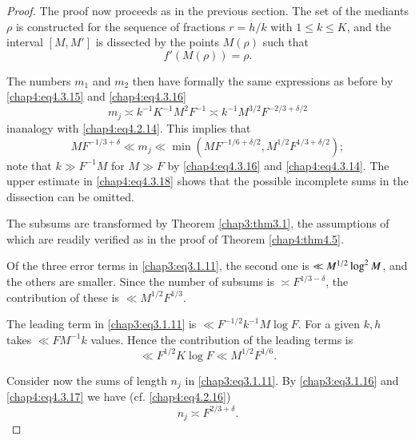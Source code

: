 \begin{proof}
The proof now proceeds as in the previous section. The set of the mediants $\rho$ is constructed for the sequence of fractions $r=h/k$ with $1\leq k\leq K$, and the interval $[M,M']$ is dissected by the points $M(\rho)$ such that 
\begin{equation}\label{chap4:eq4.3.16}
f'(M(\rho))=\rho.
\end{equation}

The numbers $m_1$ and $m_2$ then have formally the same expressions as before by \eqref{chap4:eq4.3.15} and \eqref{chap4:eq4.3.16} 
\begin{equation}\label{chap4:eq4.3.17}
m_j\asymp k^{-1}K^{-1}M^2F^{-1}\asymp k^{-1}M^{3/2}F^{-2/3+\delta/2}
\end{equation}
in\pageoriginale analogy with \eqref{chap4:eq4.2.14}. This implies that
\begin{equation}\label{chap4:eq4.3.18}
MF^{-1/3+\delta}\ll m_j\ll\min\left(MF^{-1/6+\delta/2}, M^{1/2}F^{1/3+\delta/2}\right); 
\end{equation}
note that $k\gg F^{-1}M$ for $M\gg F$ by \eqref{chap4:eq4.3.16} and \eqref{chap4:eq4.3.14}. The upper estimate in \eqref{chap4:eq4.3.18} shows that the possible incomplete sums in the dissection can be omitted.

The subsums are transformed by Theorem \ref{chap3:thm3.1}, the assumptions of which are readily verified as in the proof of Theorem \ref{chap4:thm4.5}.

Of the three error terms in \eqref{chap3:eq3.1.11}, the second one is $\ll M^{1/2}\break\log^2M$, and the others are smaller. Since the number of subsums is $\asymp F^{1/3-\delta}$, the contribution of these is $\ll M^{1/2} F^{1/3}$. 

The leading term in \eqref{chap3:eq3.1.11} is $\ll F^{-1/2}k^{-1}M\log F$. For a given $k,h$ takes $\ll FM^{-1}k$ values. Hence the contribution of the leading terms is 
$$
\ll F^{1/2}K\log F\ll M^{1/2}F^{1/6}.
$$

Consider now the sums of length $n_j$ in \eqref{chap3:eq3.1.11}. By
\eqref{chap3:eq3.1.16} and \eqref{chap4:eq4.3.17} we have
(cf. \eqref{chap4:eq4.2.16}) 
\begin{equation}\label{chap4:eq4.3.19}
n_j\asymp F^{2/3+\delta}.
\end{equation}


\end{proof}
